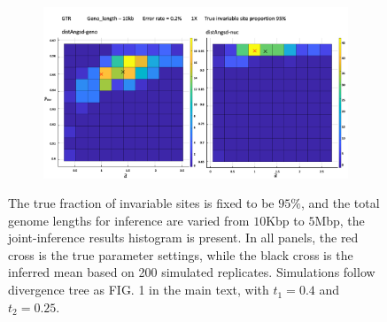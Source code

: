 \documentclass{article}
\begin{document}
\begin{figure}
\begin{subfigure}{.5\textwidth}
  \caption{}
  \label{fig:2D95s5}
\end{subfigure}
\begin{subfigure}{.5\textwidth}
  \centering
  \includegraphics[width=.99\linewidth]{10k95.png}  
  \caption{}
  \label{fig:2D95s6}
\end{subfigure}\caption{The true fraction of invariable sites is fixed to be $95\%$, and the total genome lengths for inference are varied from $10$Kbp to $5$Mbp, the joint-inference results histogram is present. In all panels, the red cross is the true parameter settings, while the black cross is the inferred mean based on 200 simulated replicates. Simulations follow divergence tree as FIG. 1 in the main text, with $t_1=0.4$ and $t_2 = 0.25$.}
\label{fig:2D95}
\end{figure}
\end{document}
